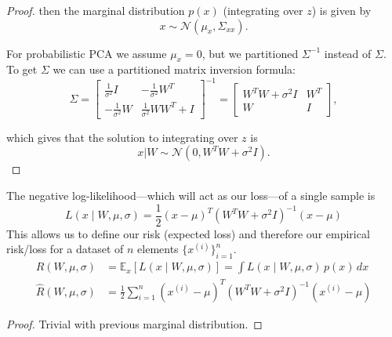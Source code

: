 \begin{proof}
    then the marginal distribution $p(x)$ (integrating over $z$) is given by
    \begin{equation}
      x \sim \mathcal{N}(\mu_x, \Sigma_{xx}).
    \end{equation}

    For probabilistic PCA we assume $\mu_x = 0$, but we partitioned $\Sigma^{-1}$ instead of $\Sigma$. To get $\Sigma$ we can use a partitioned matrix inversion formula:
    \begin{equation}
      \Sigma = \begin{bmatrix} \frac{1}{\sigma^2}I & -\frac{1}{\sigma^2}W^T \\ -\frac{1}{\sigma^2}W & \frac{1}{\sigma^2}WW^T + I \end{bmatrix}^{-1} = \begin{bmatrix} W^TW + \sigma^2 I & W^T \\ W & I \end{bmatrix},
    \end{equation}

    which gives that the solution to integrating over $z$ is
    \begin{equation}
      x | W \sim \mathcal{N}(0, W^T W + \sigma^2 I).
    \end{equation}
  \end{proof}

  \begin{theorem}
    \label{thm:log-likelihood-and-risk-of-ppca}
    The negative log-likelihood---which will act as our loss---of a single sample is 
    \begin{equation}
      L(x \mid W, \mu, \sigma) = \frac{1}{2} (x - \mu)^T (W^T W + \sigma^2 I)^{-1} (x - \mu)
    \end{equation} 
    This allows us to define our risk (expected loss) and therefore our empirical risk/loss for a dataset of $n$ elements $\{x^{(i)}\}_{i=1}^n$. 
    \begin{align}
      R(W, \mu, \sigma) & = \mathbb{E}_x [ L(x \mid W, \mu, \sigma)] = \int L(x \mid W, \mu, \sigma) \, p(x) \,dx \\ 
      \hat{R}(W, \mu, \sigma) & = \frac{1}{2} \sum_{i=1}^n (x^{(i)} - \mu)^T (W^T W + \sigma^2 I)^{-1} (x^{(i)} - \mu)
    \end{align}
  \end{theorem}
  \begin{proof}
    Trivial with previous marginal distribution. 
  \end{proof}

